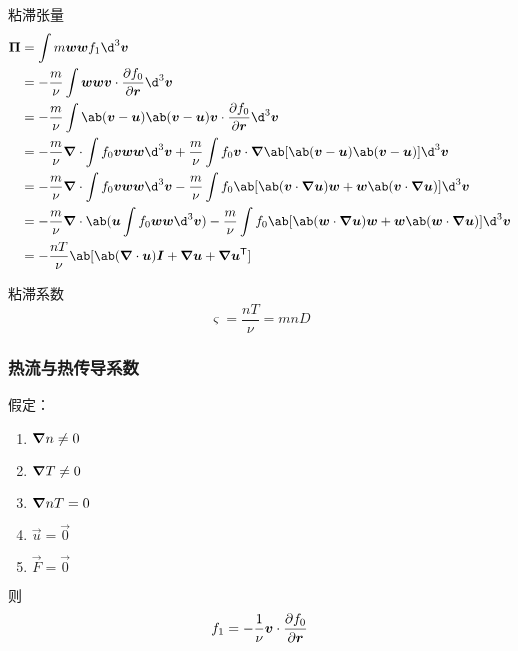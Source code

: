 粘滞张量
\begin{equation}\begin{aligned}
\vec{\Pi} &= \int m \vec{w}\vec{w} f_1 \d^3\vec{v} \\
&= - \frac{m}{\nu} \int \vec{w}\vec{w}
    \vec{v} \cdot \pdv{f_0}{\vec{r}} \d^3\vec{v} \\
&= - \frac{m}{\nu} \int \ab(\vec{v}-\vec{u})\ab(\vec{v}-\vec{u})
    \vec{v} \cdot \pdv{f_0}{\vec{r}} \d^3\vec{v} \\
&= - \frac{m}{\nu} \dive{\int f_0 \vec{v}\vec{w}\vec{w} \d^3\vec{v}}
+ \frac{m}{\nu} \int f_0 \vec{v} \cdot
    \grad{\ab[\ab(\vec{v}-\vec{u})\ab(\vec{v}-\vec{u})]}
 \d^3\vec{v} \\
&= - \frac{m}{\nu} \dive{\int f_0 \vec{v}\vec{w}\vec{w} \d^3\vec{v}}
- \frac{m}{\nu} \int f_0 \ab[
    \ab(\vec{v} \cdot \grad{\vec{u}}) \vec{w}
    + \vec{w} \ab(\vec{v} \cdot \grad{\vec{u}})
] \d^3\vec{v} \\
&= - \frac{m}{\nu} \dive{\ab(\vec{u}\int f_0 \vec{w}\vec{w} \d^3\vec{v})}
- \frac{m}{\nu} \int f_0 \ab[
    \ab(\vec{w} \cdot \grad{\vec{u}}) \vec{w}
    + \vec{w} \ab(\vec{w} \cdot \grad{\vec{u}})
] \d^3\vec{v} \\
&= - \frac{n T}{\nu} \ab[ \ab(\dive{\vec{u}}) \vec{I}
    + \grad{\vec{u}} + \grad{\vec{u}}^\T]
\end{aligned}\end{equation}

粘滞系数
\begin{equation}
\varsigma = \frac{n T}{\nu} = m n D
\end{equation}

\subsubsection{热流与热传导系数}

假定：
\begin{enumerate}
    \item $\bm{\nabla}{n} \neq 0$
    \item $\bm{\nabla}{T} \neq 0$
    \item $\bm{\nabla}{n T} = 0$
    \item $\vec{u} = \vec{0}$
    \item $\vec{F} = \vec{0}$
\end{enumerate}
则
\begin{equation}
f_1 = - \frac{1}{\nu} \bm{v} \cdot \pdv{f_0}{\bm{r}}
\end{equation}

